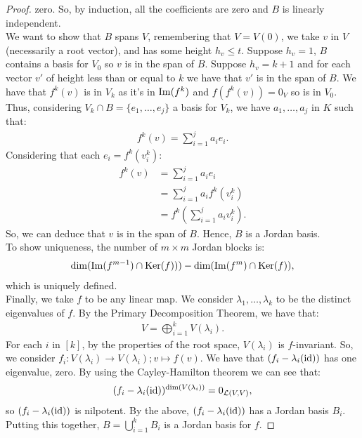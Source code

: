 \begin{proof}
    zero. So, by induction, all the coefficients are zero 
    and $B$ is linearly independent.
    \\[\baselineskip]
    We want to show that $B$ spans $V$, remembering that $V = V(0)$,
    we take $v$ in $V$ (necessarily a root vector), and has some
    height $h_v \leq t$. Suppose $h_v = 1$, $B$ contains a basis for
    $V_0$ so $v$ is in the span of $B$. Suppose $h_v = k + 1$ and
    for each vector $v'$ of height less than or equal to $k$ we have 
    that $v'$ is in the span of $B$. We have that $f^k(v)$ is in
    $V_k$ as it's in $\operatorname{Im}(f^k)$ and $f(f^k(v)) = 0_V$ so is in $V_0$.
    Thus, considering $V_k \cap B = \{e_1, \ldots, e_j\}$ a basis
    for $V_k$, we have $a_1, \ldots, a_j$ in $K$ such that: \begin{gather*}
        f^k(v) = \sum_{i = 1}^j a_i e_i.
    \end{gather*} Considering that each $e_i = f^k(v_i^k)$: \begin{align*}
        f^k(v) &= \sum_{i = 1}^j a_i e_i \\
        &= \sum_{i = 1}^j a_i f^k(v_i^k) \\
        &= f^k \left( \sum_{i = 1}^j a_i v_i^k \right).
    \end{align*} So, we can deduce that $v$ is in the span of $B$. Hence,
    $B$ is a Jordan basis.
    \\[\baselineskip]
    To show uniqueness, the number of $m \times m$ Jordan blocks
    is: \begin{gather*}
        \operatorname{dim}(\operatorname{Im}(f^{m - 1}) \cap \operatorname{Ker}(f))) - \operatorname{dim}(\operatorname{Im}(f^m) \cap \operatorname{Ker}(f)),
    \end{gather*} which is uniquely defined.
    \\[\baselineskip]
    Finally, we take $f$ to be any linear map. We consider
    $\lambda_1, \ldots, \lambda_k$ to be the distinct eigenvalues of $f$.
    By the Primary Decomposition Theorem, we have that: \begin{gather*}
        V = \bigoplus_{i = 1}^k V( \lambda_i).
    \end{gather*} For each $i$ in $[k]$, by the properties of the
    root space, $V(\lambda_i)$ is $f$-invariant. So, we consider
    $f_i : V(\lambda_i) \to V(\lambda_i); v \mapsto f(v)$.
    We have that $(f_i - \lambda_i(\operatorname{id}))$ has one eigenvalue,
    zero. By using the Cayley-Hamilton theorem we can see that: \begin{gather*}
        (f_i - \lambda_i(\operatorname{id}))^{\operatorname{dim}(V(\lambda_i))} = 0_{\mathcal{L}(V, V)},
    \end{gather*} so $(f_i - \lambda_i(\operatorname{id}))$ is nilpotent. By the above,
    $(f_i - \lambda_i(\operatorname{id}))$ has a Jordan basis $B_i$. Putting this together,
    $B = \bigcup_{i = 1}^k B_i$ is a Jordan basis for $f$.
\end{proof}


